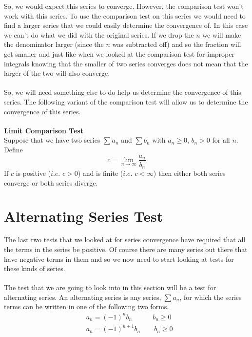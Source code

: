 \documentclass[10pt,reqno]{book}
\theoremstyle{definition}
\begin{document}
	So, we would expect this series to converge. However, the comparison test won't work with this series. To use the comparison test on this series we would need to find a larger series that we could easily determine the convergence of. In this case we can't do what we did with the original series. If we drop the $ n $ we will make the denominator larger (since the $ n $ was subtracted off) and so the fraction will get smaller and just like when we looked at the comparison test for improper integrals knowing that the smaller of two series converges does not mean that the larger of the two will also converge.\\ \\
	So, we will need something else to do help us determine the convergence of this series. The following variant of the comparison test will allow us to determine the convergence of this series.\\ \\
	\textbf{Limit Comparison Test}\\
	Suppose that we have two series $ \sum a_n $ and $ \sum b_n $ with $ a_n \geq 0 $, $ b_n > 0 $ for all $ n $. Define
	\[ c = \lim\limits_{n \to \infty} \frac{a_n}{b_n} \]
	If $ c $ is positive ($ i.e. $ $ c > 0 $) and is finite ($ i.e. $ $ c < \infty $) then either both series converge or both series diverge.
	
	\section{Alternating Series Test}
	
	The last two tests that we looked at for series convergence have required that all the terms in the series be positive. Of course there are many series out there that have negative terms in them and so we now need to start looking at tests for these kinds of series.\\ \\
	The test that we are going to look into in this section will be a test for alternating series. An alternating series is any series, $ \sum a_n $, for which the series terms can be written in one of the following two forms.
	\begin{align*}
		& a_n = (-1)^n b_n \qquad  \quad b_n \geq 0\\
		& a_n = (-1)^{n+1} b_n \qquad b_n \geq 0
 	\end{align*}
	
\end{document}
